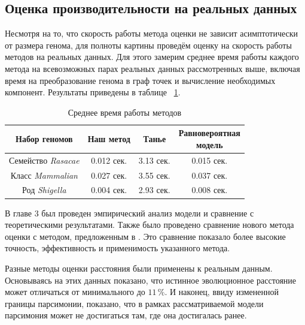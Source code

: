 \subsection{Оценка производительности на реальных данных}
Несмотря на то, что скорость работы метода оценки не зависит асимптотически от размера генома, для полноты картины проведём оценку на скорость работы методов на реальных данных.
Для этого замерим среднее время работы каждого метода на всевозможных парах реальных данных рассмотренных выше, включая время на преобразование генома в граф точек и вычисление необходимых компонент. 
Результаты приведены в таблице ~\ref{real-data-time}.
\begin{table}[!h]
    \caption{Среднее время работы методов}
    \centering
    \begin{tabular}{|*{4}{c|}}\hline
        Набор геномов & Наш метод
                      & Танье
                      & \makecell{Равновероятная \\ модель} \\\hline
        Семейство \emph{Rasacae} & 0.012 сек. & 3.13 сек. & 0.015 сек. \\\hline
        Класс \emph{Mammalian}   & 0.027 сек. & 3.55 сек. & 0.037 сек. \\\hline
        Род \emph{Shigella}      & 0.004 сек. & 2.93 сек. & 0.008 сек. \\\hline
    \end{tabular}
    \label{real-data-time}
\end{table}

\chapterconclusion
В главе 3 был проведен эмпирический анализ модели и сравнение с теоретическими результатами.
Также было проведено сравнение нового метода оценки с методом, предложенным в \cite{fr-4}. Это сравнение показало более высокие точность, эффективность и применимость указанного метода.

Разные методы оценки расстояния были применены к реальным данным.
Основываясь на этих данных показано, что истинное эволюционное расстояние может отличаться от минимального до $11 \, \%$.
И наконец, ввиду измененной границы парсимонии, показано, что в рамках рассматриваемой модели парсимония может не достигаться там, где она достигалась ранее.